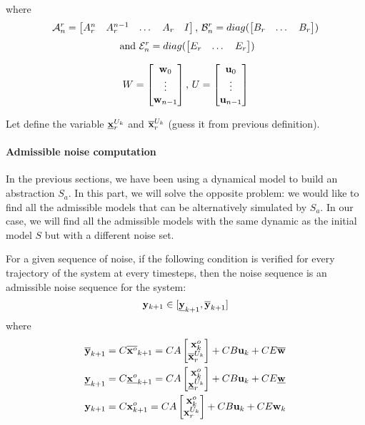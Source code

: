 where
$$
\mathcal{A}^r_n = 
\begin{bmatrix}
A_r^n & A_r^{n-1} &\dots & A_r & I
\end{bmatrix}
\textrm{, }
\mathcal{B}^r_n =
diag( 
\begin{bmatrix}
B_r &
\dots &
B_r
\end{bmatrix})
$$
$$\textrm{ and }
\mathcal{E}^r_n = 
diag(\begin{bmatrix}
E_r &
\dots &
E_r
\end{bmatrix} )
$$

$$
W = \begin{bmatrix}
 \mathbf{w}_0\\
\vdots\\
 \mathbf{w}_{n-1}
\end{bmatrix}
\textrm{, }
U = \begin{bmatrix}
 \mathbf{u}_0\\
\vdots\\
 \mathbf{u}_{n-1}
\end{bmatrix}
$$

\newcommand{\xuki}{\minf{\x}^{U_k}_r}
\newcommand{\xuks}{\msup{\x}^{U_k}_r}
\newcommand{\xuk}{\x^{U_k}_r}
Let define the variable $\xuki$ and $\xuks$ (guess it from previous definition).

\paragraph{Admissible noise computation}
In the previous sections, we have been using a dynamical model to build an abstraction $S_a$. In this part, we will solve the opposite problem:  we would like to find all the admissible models that can be alternatively simulated by $S_a$.
In our case, we will find all the admissible models with the same dynamic as the initial model $S$ but with a different noise set.

\newcommand{\ANoise}{\Omega}
\newcommand{\NoiseSet}{\mathcal{W}}
\newcommand{\infseq}{\omega}

\newcommand{\sykn}{\msup{\y}_{k+1}}%
\newcommand{\iykn}{\minf{\y}_{k+1}}%
For a given sequence of noise, if the following condition is verified for every trajectory of the system at every timesteps, then the noise sequence is an admissible noise sequence for the system:
\begin{equation} \label{valid_transition}
\ykn \in [\iykn,\sykn]
\end{equation}
where 
\begin{align*}
\sykn &= C \msup{\xo}_{k+1} = 
C A 
\begin{bmatrix}
\xo_{k} \\
\xuks
\end{bmatrix}
+ C B \uk + C E \msup{\w}
\\
\iykn &= C \minf{\xo}_{k+1} 
= C A 
\begin{bmatrix}
\xo_{k} \\
\xuki
\end{bmatrix}
+ C B \uk + C E \minf{\w}
\\
\ykn &= C \xo_{k+1}
= C A 
\begin{bmatrix}
\xo_{k} \\
\xuk
\end{bmatrix}
+ C B \uk + C E \wk
\end{align*}

